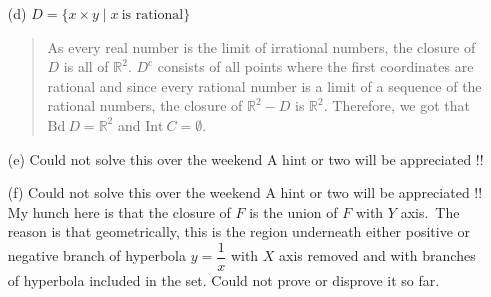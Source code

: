 \documentclass[12pt, a4paper]{article}
\newcommand{\reals}{\mathbb{R}} %
\begin{document}
\begin{itemize}
\begin{itemize}
\begin{quote}
\end{quote}
\item[]
\item[]

\item[(d)]
$D = \{x \times y \mid x \ \mbox{is rational}\}$
\begin{quote}
As every real number is the limit of irrational numbers,
the closure of $D$ is all of $\reals^2$. $D^c$ consists
of all points where the first coordinates are rational
and since every rational number is a limit of a sequence
of the rational numbers, the closure of $\reals^2 - D$ is
$\reals^2$. Therefore, we got that $\mbox{Bd} \ D = \reals^2$
and $\mbox{Int} \ C = \emptyset$.

\end{quote}
\item[]
\item[]

\item[(e)]
Could not solve this over the weekend {\Large\frownie}
\newline
A hint or two will be appreciated !!

\item[]
\item[]

\item[(f)]
Could not solve this over the weekend {\Large\frownie}
\newline
A hint or two will be appreciated !!
\newline
\newline
My hunch here is that the closure of $F$ is the union
of $F$ with $Y$ axis.\ The reason is that geometrically,
this is the region underneath either positive
or negative branch of hyperbola $y = \dfrac{1}{x}$
with $X$ axis removed and with branches of hyperbola included
in the set. Could not prove or disprove it so far.
\end{itemize}
\end{itemize}
\end{document}
